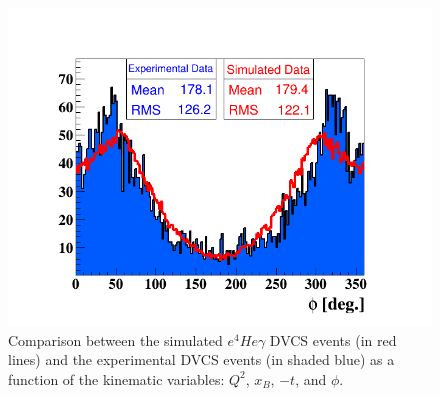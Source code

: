 \begin{figure}[h!]
\hspace{+0.5in}\includegraphics[scale=0.31]{fig_dvcs/comp/phi_h_Coh.png}
\caption{Comparison between the simulated $e^{4}He\gamma$ DVCS events (in red 
lines) and the experimental DVCS events (in shaded blue) as a function of the 
kinematic variables: $Q^{2}$, $x_{B}$, $-t$, and $\phi$. }
\label{fig:coh_comparison_with_simulation_1}
\end{figure}


